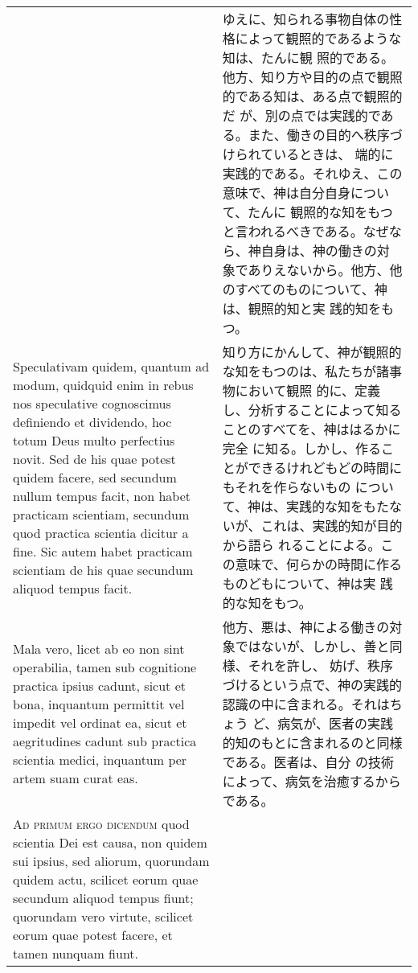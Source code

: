 \documentclass[10pt]{jsarticle} %
\begin{document}
\begin{longtable}{p{21em}p{21em}}
&

ゆえに、知られる事物自体の性格によって観照的であるような知は、たんに観
照的である。他方、知り方や目的の点で観照的である知は、ある点で観照的だ
が、別の点では実践的である。また、働きの目的へ秩序づけられているときは、
端的に実践的である。それゆえ、この意味で、神は自分自身について、たんに
観照的な知をもつと言われるべきである。なぜなら、神自身は、神の働きの対
象でありえないから。他方、他のすべてのものについて、神は、観照的知と実
践的知をもつ。


\\


Speculativam quidem, quantum ad modum, quidquid enim in rebus nos
speculative cognoscimus definiendo et dividendo, hoc totum Deus multo
perfectius novit. Sed de his quae potest quidem facere, sed secundum
nullum tempus facit, non habet practicam scientiam, secundum quod
practica scientia dicitur a fine. Sic autem habet practicam scientiam
de his quae secundum aliquod tempus facit.


&

知り方にかんして、神が観照的な知をもつのは、私たちが諸事物において観照
的に、定義し、分析することによって知ることのすべてを、神ははるかに完全
に知る。しかし、作ることができるけれどもどの時間にもそれを作らないもの
について、神は、実践的な知をもたないが、これは、実践的知が目的から語ら
れることによる。この意味で、何らかの時間に作るものどもについて、神は実
践的な知をもつ。

\\


Mala vero, licet ab eo non sint operabilia, tamen sub cognitione
practica ipsius cadunt, sicut et bona, inquantum permittit vel impedit
vel ordinat ea, sicut et aegritudines cadunt sub practica scientia
medici, inquantum per artem suam curat eas.

&

他方、悪は、神による働きの対象ではないが、しかし、善と同様、それを許し、
妨げ、秩序づけるという点で、神の実践的認識の中に含まれる。それはちょう
ど、病気が、医者の実践的知のもとに含まれるのと同様である。医者は、自分
の技術によって、病気を治癒するからである。

\\


{\scshape Ad primum ergo dicendum} quod scientia Dei est causa, non
quidem sui ipsius, sed aliorum, quorundam quidem actu, scilicet eorum
quae secundum aliquod tempus fiunt; quorundam vero virtute, scilicet
eorum quae potest facere, et tamen nunquam fiunt.

&


\end{longtable}
\end{document}
